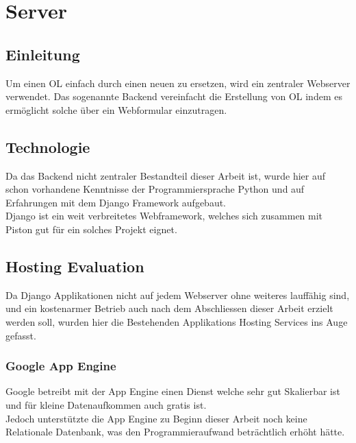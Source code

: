 
\newpage
\section{Server} %
\label{sec:Server}

\subsection{Einleitung} %
\label{sub:Einleitung}
Um einen OL einfach durch einen neuen zu ersetzen, wird ein zentraler Webserver verwendet. Das sogenannte Backend vereinfacht die Erstellung von OL indem es ermöglicht solche über ein Webformular einzutragen.

\subsection{Technologie} %
\label{sub:Technologie}
Da das Backend nicht zentraler Bestandteil dieser Arbeit ist, wurde hier auf schon vorhandene Kenntnisse der Programmiersprache Python und auf Erfahrungen mit dem Django Framework aufgebaut.\\
Django ist ein weit verbreitetes Webframework, welches sich zusammen mit Piston gut für ein solches Projekt eignet.

\subsection{Hosting Evaluation} %
\label{sub:Hosting Evaluation}
Da Django Applikationen nicht auf jedem Webserver ohne weiteres lauffähig sind, und ein kostenarmer Betrieb auch nach dem Abschliessen dieser Arbeit erzielt werden soll, wurden hier die Bestehenden Applikations Hosting Services ins Auge gefasst.

\subsubsection{Google App Engine} %
\label{ssub:Google App Engine}
Google betreibt mit der App Engine einen Dienst welche sehr gut Skalierbar ist und für kleine Datenaufkommen auch gratis ist.\\
Jedoch unterstützte die App Engine zu Beginn dieser Arbeit noch keine Relationale Datenbank, was den Programmieraufwand beträchtlich erhöht hätte.


